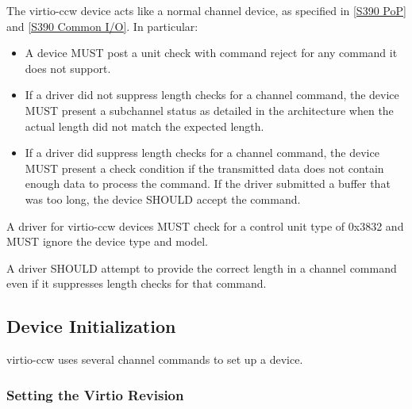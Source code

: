 
The virtio-ccw device acts like a normal channel device, as specified
in \hyperref[intro:S390 PoP]{[S390 PoP]} and \hyperref[intro:S390 Common I/O]{[S390 Common I/O]}. In particular:

\begin{itemize}
\item A device MUST post a unit check with command reject for any command
  it does not support.

\item If a driver did not suppress length checks for a channel command,
  the device MUST present a subchannel status as detailed in the
  architecture when the actual length did not match the expected length.

\item If a driver did suppress length checks for a channel command, the
  device MUST present a check condition if the transmitted data does
  not contain enough data to process the command. If the driver submitted
  a buffer that was too long, the device SHOULD accept the command.
\end{itemize}


A driver for virtio-ccw devices MUST check for a control unit
type of 0x3832 and MUST ignore the device type and model.

A driver SHOULD attempt to provide the correct length in a channel
command even if it suppresses length checks for that command.

\subsection{Device Initialization}\label{sec:Virtio Transport Options / Virtio over channel I/O / Device Initialization}

virtio-ccw uses several channel commands to set up a device.

\subsubsection{Setting the Virtio Revision}\label{sec:Virtio Transport Options / Virtio over channel I/O / Device Initialization / Setting the Virtio Revision}

